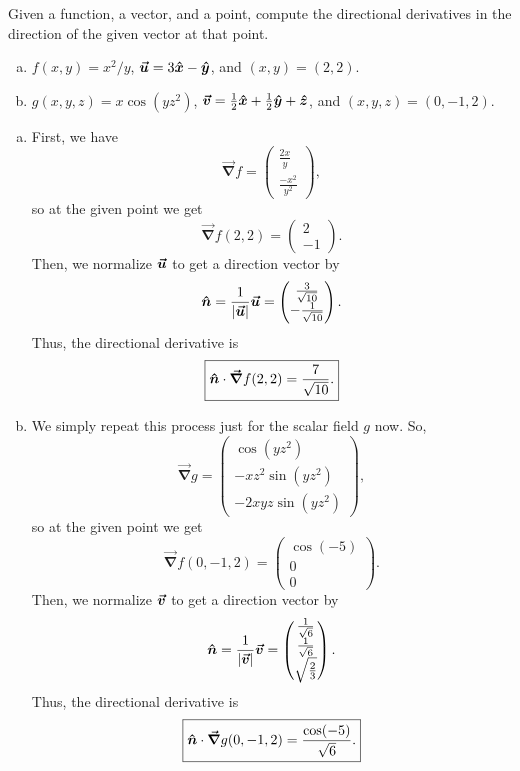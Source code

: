 \documentclass[12pt]{article} %
\newcommand{\grad}{\boldsymbol{\vec{\nabla}}}
\begin{document}
\newpage
\begin{problem}
Given a function, a vector, and a point, compute the directional derivatives in the direction of the given vector at that point.
\begin{enumerate}[(a)]
    \item $f(x,y)=x^2/y$, $\boldsymbol{\boldsymbol{\vec{u}}} = 3\boldsymbol{\hat{x}} -\boldsymbol{\hat{y}}$, and $(x,y)=(2,2)$.
    \item $g(x,y,z)=x\cos(yz^2)$, $\boldsymbol{\boldsymbol{\vec{v}}} = \frac{1}{2}\boldsymbol{\hat{x}} + \frac{1}{2} \boldsymbol{\hat{y}} + \boldsymbol{\hat{z}}$, and $(x,y,z)=(0,-1,2)$.
\end{enumerate}
\end{problem}
\begin{solution}
\begin{enumerate}[(a)]
    \item First, we have
    \[
    \grad f = \begin{pmatrix} \frac{2x}{y} \\ \frac{-x^2}{y^2} \end{pmatrix},
    \]
    so at the given point we get
    \[
    \grad f(2,2) = \begin{pmatrix} 2 \\ -1 \end{pmatrix}.
    \]
    Then, we normalize $\boldsymbol{\boldsymbol{\vec{u}}}$ to get a direction vector by
    \[
    \boldsymbol{\hat{n}} = \frac{1}{|\boldsymbol{\boldsymbol{\vec{u}}}|} \boldsymbol{\boldsymbol{\vec{u}}} = \begin{pmatrix} \frac{3}{\sqrt{10}} \\ -\frac{1}{\sqrt{10}} \end{pmatrix}.
    \]
    Thus, the directional derivative is
    \[
        \boxed{\unitvec \cdot \grad f(2,2) = \frac{7}{\sqrt{10}} .}
    \]
    \item We simply repeat this process just for the scalar field $g$ now. So,
    \[
    \grad g = \begin{pmatrix} \cos(yz^2) \\ -xz^2 \sin(yz^2) \\ - 2xyz\sin(yz^2) \end{pmatrix},
    \]
    so at the given point we get
    \[
    \grad f(0,-1,2) = \begin{pmatrix} \cos(-5) \\ 0 \\ 0 \end{pmatrix}.
    \]
    Then, we normalize $\boldsymbol{\boldsymbol{\vec{v}}}$ to get a direction vector by
    \[
    \boldsymbol{\hat{n}} = \frac{1}{|\boldsymbol{\boldsymbol{\vec{v}}}|} \boldsymbol{\boldsymbol{\vec{v}}} = \begin{pmatrix} \frac{1}{\sqrt{6}} \\ \frac{1}{\sqrt{6}} \\ \sqrt{\frac{2}{3}} \end{pmatrix}.
    \]
    Thus, the directional derivative is
    \[
        \boxed{\unitvec \cdot \grad g(0,-1,2) = \frac{\cos(-5)}{\sqrt{6}} .}
    \]
\end{enumerate}
\end{solution}
\end{document}
